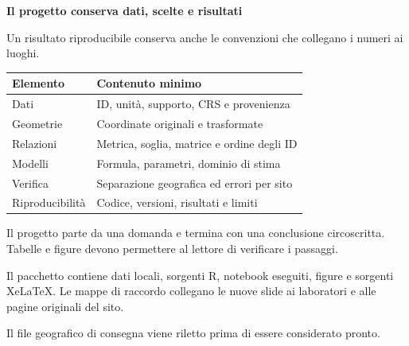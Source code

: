 \documentclass[12pt,aspectratio=1610]{beamer}
\newcommand{\PBody}[1]{\par{\fontsize{11.3}{14.8}\selectfont #1\par}}
\newcommand{\PSmall}[1]{\par{\fontsize{9.8}{13.1}\selectfont #1\par}}
\newcommand{\PInfo}[1]{%
\begin{tcolorbox}[enhanced,arc=1.6mm,boxrule=.55pt,colback=GeoTint,
 colframe=Rule!80!Classical,left=2.3mm,right=2.3mm,top=2mm,bottom=2mm,
 before skip=1mm,after skip=1mm]
\PSmall{#1}\end{tcolorbox}}
\begin{document}
\begin{frame}[plain]\hypertarget{slide106}{}
\begin{lrbox}{\TitleBox}
\begin{minipage}[t]{17.7cm}\raggedright\color{Ink}\fontsize{11.3}{14.8}\selectfont
\color{Navy}\bfseries\fontsize{20.6}{24.5}\selectfont Il progetto conserva dati, scelte e risultati
\end{minipage}\end{lrbox}

\begin{lrbox}{\RecallBox}
\begin{minipage}[t]{14.3cm}\raggedright\color{Ink}\fontsize{11.3}{14.8}\selectfont
\fontsize{10.3}{13.8}\selectfont Un risultato riproducibile conserva anche le convenzioni che collegano i numeri ai luoghi.
\end{minipage}\end{lrbox}

\begin{lrbox}{\PilotLeftBox}
\begin{minipage}[t]{10.05cm}\raggedright\color{Ink}\fontsize{11.3}{14.8}\selectfont
{\fontsize{10.2}{13.1}\selectfont\renewcommand{\arraystretch}{1.45}\begin{tabular}{@{}p{3.4cm}p{5.6cm}@{}}\toprule
\textbf{Elemento} & \textbf{Contenuto minimo}\\\midrule
Dati & ID, unità, supporto, CRS e provenienza\\
Geometrie & Coordinate originali e trasformate\\
Relazioni & Metrica, soglia, matrice e ordine degli ID\\
Modelli & Formula, parametri, dominio di stima\\
Verifica & Separazione geografica ed errori per sito\\
Riproducibilità & Codice, versioni, risultati e limiti\\
\bottomrule\end{tabular}}

\end{minipage}\end{lrbox}

\begin{lrbox}{\PilotRightBox}
\begin{minipage}[t]{7.55cm}\raggedright\color{Ink}\fontsize{11.3}{14.8}\selectfont
\PBody{Il progetto parte da una domanda e termina con una conclusione circoscritta. Tabelle e figure devono permettere al lettore di verificare i passaggi.}
\vspace{2.5mm}
\PInfo{Il pacchetto contiene dati locali, sorgenti R, notebook eseguiti, figure e sorgenti XeLaTeX. Le mappe di raccordo collegano le nuove slide ai laboratori e alle pagine originali del sito.}
\PBody{Il file geografico di consegna viene riletto prima di essere considerato pronto.}
\vspace{2.5mm}


\end{minipage}
\end{lrbox}
\end{frame}
\end{document}
